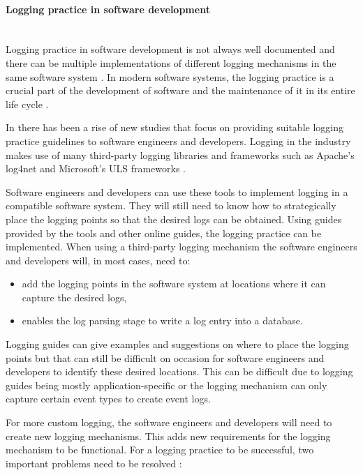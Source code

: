 \paragraph{Logging practice in software development}\leavevmode\\
Logging practice in software development is not always well documented and there can be multiple implementations of different logging mechanisms in the same software system \cite{Pecchia2015, Kitchenham2007}. In modern software systems, the logging practice is a crucial part of the development of software and the maintenance of it in its entire life cycle \cite{Rong2018}.\par In  there has been a rise of new studies that focus on providing suitable logging practice guidelines to software engineers and developers. Logging in the industry makes use of many third-party logging libraries and frameworks such as Apache's log4net and Microsoft's ULS frameworks \cite{Zhu2015, Rong2018}.\par Software engineers and developers can use these tools to implement logging in a compatible software system. They will still need to know how to strategically place the logging points so that the desired logs can be obtained. Using guides provided by the tools and other online guides, the logging practice can be implemented. When using a third-party logging mechanism the software engineers and developers will, in most cases, need to:

\begin{itemize}
	\item add the logging points in the software system at locations where it can capture the desired logs,
	\item enables the log parsing stage to write a log entry into a database.
\end{itemize}

Logging guides can give examples and suggestions on where to place the logging points but that can still be difficult on occasion for software engineers and developers to identify these desired locations. This can be difficult due to logging guides being mostly application-specific or the logging mechanism can only capture certain event types to create event logs. \par For more custom logging, the software engineers and developers will need to create new logging mechanisms. This adds new requirements for the logging mechanism to be functional. For a logging practice to be successful, two important problems need to be resolved \cite{Zhu2015, Zhu2019, Rong2018}:

